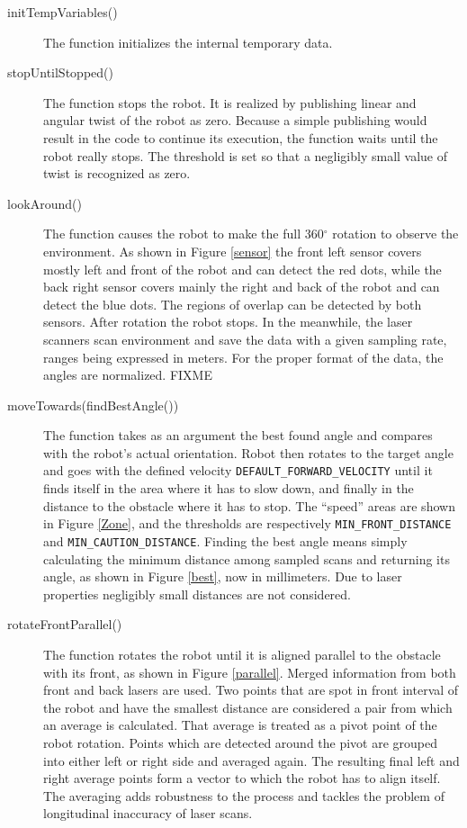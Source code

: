 \begin{description}
\item[initTempVariables()] The function initializes the internal temporary data. 
\item[stopUntilStopped()] The function stops the robot. It is realized by publishing linear and angular twist of the robot as zero. Because a simple publishing would result in the code to continue its execution, the function waits until the robot really stops. The threshold is set so that a negligibly small value of twist is recognized as zero.
\item[lookAround()] The function causes the robot to make the full 360$^{\circ}$ rotation to observe the environment. As shown in Figure \ref{sensor} the front left sensor covers mostly left and front of the robot and can detect the red dots, while the back right sensor covers mainly the right and back of the robot and can detect the blue dots. The regions of overlap can be detected by both sensors. After rotation the robot stops. In the meanwhile, the laser scanners scan environment and save the data with a given sampling rate, ranges being expressed in meters. For the proper format of the data, the angles are normalized. FIXME
\item[moveTowards(findBestAngle())] The function takes as an argument the best found angle and compares with the robot's actual orientation. Robot then rotates to the target angle and goes with the defined velocity \texttt{DEFAULT\_FORWARD\_VELOCITY}
 until it finds itself in the area where it has to slow down, and finally in the distance to the obstacle where it has to stop. The ``speed'' areas are shown in Figure \ref{Zone}, and the thresholds are respectively \texttt{MIN\_FRONT\_DISTANCE} and \texttt{MIN\_CAUTION\_DISTANCE}. 
 Finding the best angle means simply calculating the minimum distance among sampled scans and returning its angle, as shown in Figure \ref{best}, now in millimeters. Due to laser properties negligibly small distances are not considered.
\item[rotateFrontParallel()] The function rotates the robot until it is aligned parallel to the obstacle with its front, as shown in Figure \ref{parallel}. Merged information from both front and back lasers are used. Two points that are spot in front interval of the robot and have the smallest distance are considered a pair from which an average is calculated. That average is treated as a pivot point of the robot rotation. Points which are detected around the pivot are grouped into either left or right side and averaged again. The resulting final left and right average points form a vector to which the robot has to align itself. The averaging adds robustness to the process and tackles the problem of longitudinal inaccuracy of laser scans.

\end{description}
